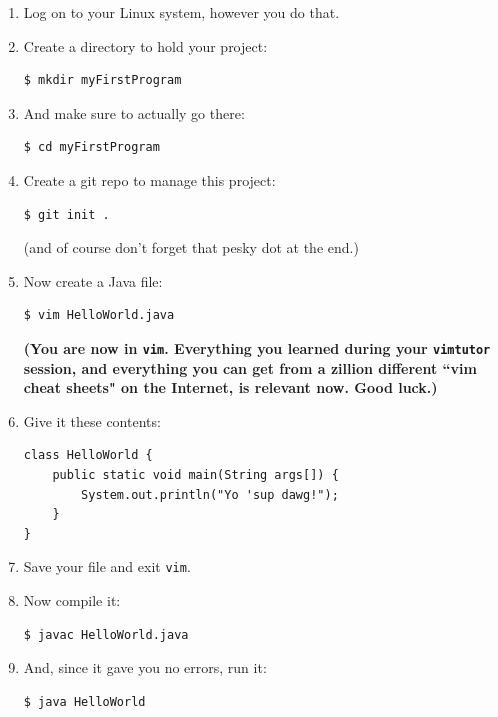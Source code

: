 \begin{enumerate}
\itemsep.1em
\item Log on to your Linux system, however you do that.
\item Create a directory to hold your project:
\begin{verbatim}
$ mkdir myFirstProgram
\end{verbatim}

\item And make sure to actually go there:
\begin{verbatim}
$ cd myFirstProgram
\end{verbatim}

\item Create a git repo to manage this project:
\begin{verbatim}
$ git init .
\end{verbatim}

(and of course don't forget that pesky dot at the end.)

\item Now create a Java file:
\begin{verbatim}
$ vim HelloWorld.java
\end{verbatim}

\textbf{(You are now in \texttt{vim}. Everything you learned during your
\texttt{vimtutor} session, and everything you can get from a zillion different
``vim cheat sheets" on the Internet, is relevant now. Good luck.)}

\item Give it these contents:
\begin{verbatim}
class HelloWorld {
    public static void main(String args[]) {
        System.out.println("Yo 'sup dawg!");
    }
}
\end{verbatim}

\item Save your file and exit \texttt{vim}.

\item Now compile it:
\begin{verbatim}
$ javac HelloWorld.java
\end{verbatim}

\item And, since it gave you no errors, run it:
\begin{verbatim}
$ java HelloWorld
\end{verbatim}

\end{enumerate}

